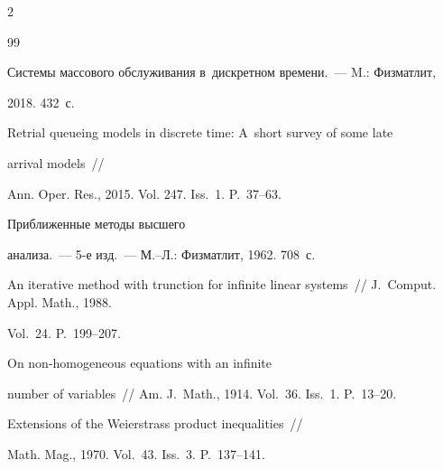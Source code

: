 \begin{multicols}{2}
{{\begin{thebibliography}{99}









Системы массового обслуживания в~дискретном времени.~--- M.: Физматлит, 


2018. 432~с.


















Retrial queueing models in discrete time: A~short survey of some late 


arrival models~//


Ann. Oper. Res., 2015. Vol. 247. Iss.~1. P.~37--63.







 Приближенные методы высшего 


анализа.~--- 5-е изд.~--- М.--Л.: Физматлит, 1962. 708~с.









An iterative method with trunction for infinite linear systems~// J.~Comput. Appl. Math., 1988.


Vol.~24. P.~199--207.







 On non-homogeneous equations with an infinite 


number of variables~// Am. J.~Math., 1914. Vol.~36. Iss.~1. P.~13--20.









Extensions of the Weierstrass product inequalities~//


Math. Mag., 1970. Vol.~43. Iss.~3. P.~137--141.


\end{thebibliography}





 }


 }





\end{multicols}
